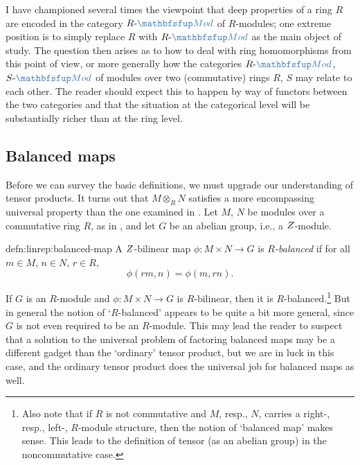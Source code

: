 I have championed several times the viewpoint that deep properties of
a ring $R$ are encoded in the category $R\text{-}\categ{Mod}$ of
$R$-modules; one extreme position is to simply replace $R$ with
$R\text{-}\categ{Mod}$ as the main object of study. The question then
arises as to how to deal with ring homomorphisms from this point of
view, or more generally how the categories $R\text{-}\categ{Mod}$,
$S\text{-}\categ{Mod}$ of modules over two (commutative) rings $R$,
$S$ may relate to each other. The reader should expect this to happen
by way of functors between the two categories and that the situation
at the categorical level will be substantially richer than at the ring
level.

\subsection{Balanced maps}
\label{subsec:linrep:balanced-maps}
Before we can survey the basic definitions, we must upgrade our
understanding of tensor products. It turns out that $M \otimes_R N$
satisfies a more encompassing universal property than the one examined
in
. Let
$M$, $N$ be modules over a commutative ring $R$, as in
,
and let $G$ be an abelian group, i.e., a $Z$-module.

\begin{defn}{}{defn:linrep:balanced-map}
  A $Z$-bilinear map $\phi : M \times N \to G$ is \emph{$R$-balanced}
  if for all $m \in M$, $n \in N$, $r \in R$,
  \[
    \phi(rm, n) = \phi(m, rn).
  \]
\end{defn}

If $G$ is an $R$-module and $\phi : M \times N \to G$ is $R$-bilinear,
then it is $R$-balanced.\footnote{Also note that if $R$ is not
  commutative and $M$, resp., $N$, carries a right-, resp., left-,
  $R$-module structure, then the notion of `balanced map' makes sense.
  This leads to the definition of tensor (as an abelian group) in the
  noncommutative case.} But in general the notion of `$R$-balanced'
appears to be quite a bit more general, since $G$ is not even required
to be an $R$-module. This may lead the reader to suspect that a
solution to the universal problem of factoring balanced maps may be a
different gadget than the `ordinary' tensor product, but we are in
luck in this case, and the ordinary tensor product does the universal
job for balanced maps as well.

